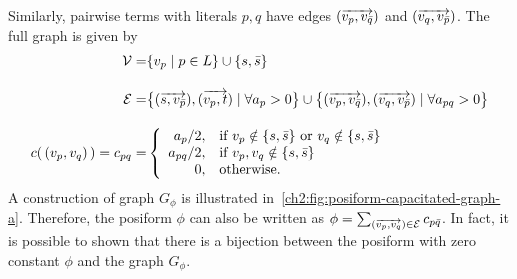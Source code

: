 \begin{center}
\end{center}

Similarly, pairwise terms with literals $p,q$ have edges $( \overrightarrow{ v_p,v_{\bar{q}}} ) $ and $( \overrightarrow{ v_q,v_{\bar{p}}} )$. The full graph is given by
\begin{align*}
	\mathcal{V} =& \{ v_p \; | \; p \in L \} \cup \{s,\bar{s}\} \\[1em]
	\mathcal{E} =& \big\{ ( \overrightarrow{ s,v_{\bar{p}}} ),( \overrightarrow{ v_p,t} ) \; | \; \forall a_p>0 \big\} \cup \big\{ ( \overrightarrow{ v_p,v_{\bar{q}}} ), ( \overrightarrow{ v_q,v_{\bar{p}}} ) \; | \; \forall a_{pq} > 0 \big\}  \\[1em]
	c(\, (v_p,v_q)\, ) = c_{pq} =& \left\{ \begin{array}{rl}
		a_{p}/2, & \text{if } v_p \notin \{s,\bar{s}\} \text{ or } v_q \notin \{s,\bar{s}\} \\
		a_{pq}/2, & \text{if } v_p,v_q \notin \{s,\bar{s}\}\\ 
		0,& \text{otherwise}.
	\end{array}\right.
\end{align*}
%
A construction of graph $G_{\phi}$ is illustrated in~\cref{ch2:fig:posiform-capacitated-graph-a}. Therefore, the posiform $\phi$ can also be written as $\phi = \sum_{ ( \overrightarrow{ v_p,v_q} ) \in \mathcal{E}}{ c_{p\bar{q}} }$. In fact, it is possible to shown that there is a bijection between the posiform with zero constant $\phi$ and the graph $G_{\phi}$.


